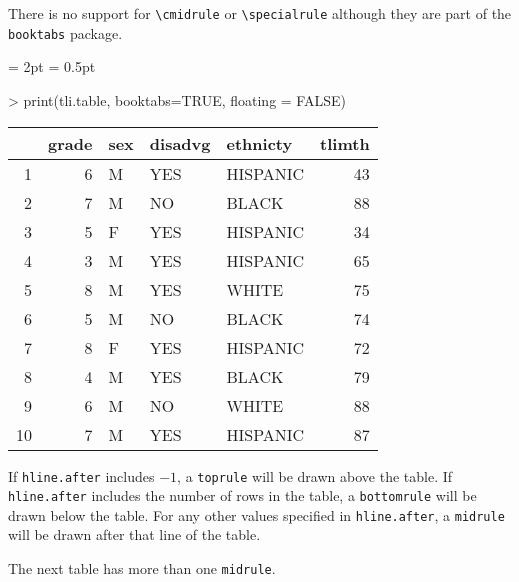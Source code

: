 \documentclass[letterpaper]{article}
\begin{document}
There is no support for \verb+\cmidrule+ or \verb+\specialrule+
although they are part of the \texttt{booktabs} package.

\heavyrulewidth = 2pt
\lightrulewidth = 0.5pt

\begin{Schunk}
\begin{Sinput}
> print(tli.table, booktabs=TRUE, floating = FALSE)
\end{Sinput}
% latex table generated in R 3.1.1 by xtable 1.7-3 package
% 
\begin{tabular}{|rr|lp{3cm}l|r|}
  \toprule
 & grade & sex & disadvg & ethnicty & tlimth \\ 
  \midrule
1 & 6 & M & YES & HISPANIC & 43 \\ 
  2 &  7 & M & NO & BLACK & 88 \\ 
  3 &   5 & F & YES & HISPANIC &  34 \\ 
  4 &    3 & M & YES & HISPANIC &   65 \\ 
  5 &     8 & M & YES & WHITE &    75 \\ 
  6 & 5 & M & NO & BLACK & 74 \\ 
  7 &  8 & F & YES & HISPANIC & 72 \\ 
  8 &   4 & M & YES & BLACK &  79 \\ 
  9 &    6 & M & NO & WHITE &   88 \\ 
  10 &     7 & M & YES & HISPANIC &    87 \\ 
   \bottomrule
\end{tabular}\end{Schunk}

\vspace{12pt}
If \texttt{hline.after} includes $-1$, a \texttt{toprule} will be
drawn above the table. If \texttt{hline.after} includes the number of
rows in the table, a \texttt{bottomrule} will be drawn below the
table. For any other values specified in \texttt{hline.after}, a
\texttt{midrule} will be drawn after that line of the table.

The next table has more than one \texttt{midrule}.
\end{document}
